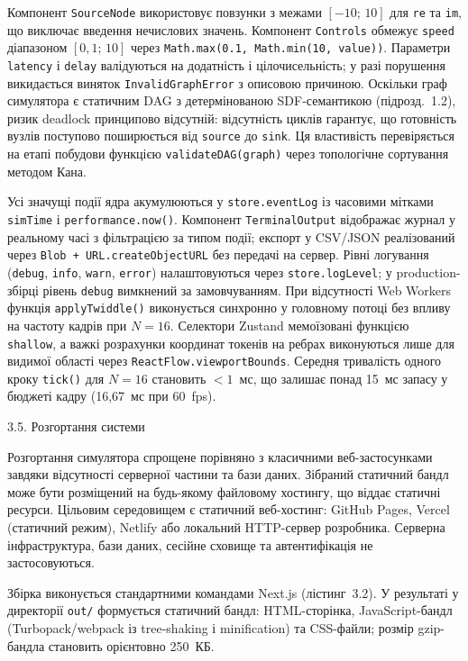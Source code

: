 Компонент \texttt{SourceNode} використовує повзунки з межами
\([-10;\,10]\) для \texttt{re} та \texttt{im}, що виключає введення
нечислових значень. Компонент \texttt{Controls} обмежує \texttt{speed}
діапазоном \([0{,}1;\,10]\) через \texttt{Math.max(0.1, Math.min(10,
value))}. Параметри \texttt{latency} і \texttt{delay} валідуються на
додатність і цілочисельність; у разі порушення викидається виняток
\texttt{InvalidGraphError} з описовою причиною. Оскільки граф симулятора
є статичним DAG з детермінованою SDF-семантикою (підрозд.~1.2), ризик
deadlock принципово відсутній: відсутність циклів гарантує, що готовність
вузлів поступово поширюється від \texttt{source} до \texttt{sink}. Ця
властивість перевіряється на етапі побудови функцією
\texttt{validateDAG(graph)} через топологічне сортування методом Кана.

Усі значущі події ядра акумулюються у \texttt{store.eventLog} із
часовими мітками \texttt{simTime} і \texttt{performance.now()}.
Компонент \texttt{TerminalOutput} відображає журнал у реальному часі з
фільтрацією за типом події; експорт у CSV/JSON реалізований через
\texttt{Blob + URL.createObjectURL} без передачі на сервер. Рівні
логування (\texttt{debug}, \texttt{info}, \texttt{warn}, \texttt{error})
налаштовуються через \texttt{store.logLevel}; у production-збірці рівень
\texttt{debug} вимкнений за замовчуванням. При відсутності Web Workers
функція \texttt{applyTwiddle()} виконується синхронно у головному потоці
без впливу на частоту кадрів при \(N=16\). Селектори Zustand мемоїзовані
функцією \texttt{shallow}, а важкі розрахунки координат токенів на
ребрах виконуються лише для видимої області через
\texttt{ReactFlow.viewportBounds}. Середня тривалість одного кроку
\texttt{tick()} для \(N=16\) становить \(<1\)~мс, що залишає понад
15~мс запасу у бюджеті кадру (16,67~мс при 60~fps).

\protect{}\label{_Toc229681152}{}3.5. Розгортання системи

Розгортання симулятора спрощене порівняно з класичними веб-застосунками
завдяки відсутності серверної частини та бази даних. Зібраний статичний
бандл може бути розміщений на будь-якому файловому хостингу, що віддає
статичні ресурси. Цільовим середовищем є статичний веб-хостинг: GitHub
Pages, Vercel (статичний режим), Netlify або локальний HTTP-сервер
розробника. Серверна інфраструктура, бази даних, сесійне сховище та
автентифікація не застосовуються.

Збірка виконується стандартними командами Next.js (лістинг~3.2). У
результаті у директорії \texttt{out/} формується статичний бандл:
HTML-сторінка, JavaScript-бандл (Turbopack/webpack із tree-shaking і
minification) та CSS-файли; розмір gzip-бандла становить орієнтовно
250~КБ.

